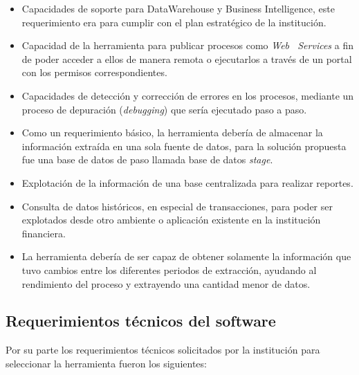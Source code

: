 \begin{itemize}
\item Capacidades de soporte para DataWarehouse y Business Intelligence, este
  requerimiento era para cumplir con el plan estratégico de la institución.

\item Capacidad de la herramienta para publicar procesos como \emph{Web
\    Services} a fin de poder acceder a ellos de manera remota o ejecutarlos a
  través de un portal con los permisos correspondientes.

\item Capacidades de detección y corrección de errores en los procesos, mediante
  un proceso de depuración (\emph{debugging}) que sería ejecutado paso a paso.

\item Como un requerimiento básico, la herramienta debería de almacenar la
  información extraída en una sola fuente de datos, para la solución propuesta
  fue una base de datos de paso llamada base de datos \emph{stage}.

\item Explotación de la información de una base centralizada para realizar
  reportes.

\item Consulta de datos históricos, en especial de transacciones, para poder ser
  explotados desde otro ambiente o aplicación existente en la institución
  financiera.

\item La herramienta debería de ser capaz de obtener solamente la información
  que tuvo cambios entre los diferentes periodos de extracción, ayudando al
  rendimiento del proceso y extrayendo una cantidad menor de datos.
\end{itemize}

\subsection{Requerimientos técnicos del software}

Por su parte los requerimientos técnicos solicitados por la institución para
seleccionar la herramienta fueron los siguientes:

